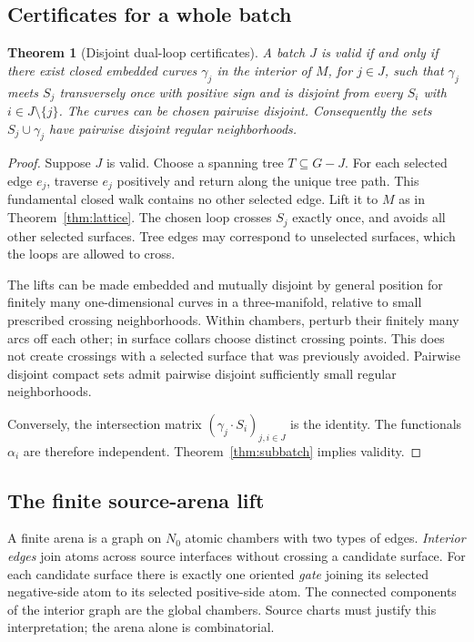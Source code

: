 \documentclass[11pt]{article}
\newtheorem{theorem}{Theorem}[section]
\theoremstyle{definition}
\begin{document}
\subsection{Certificates for a whole batch}
\begin{theorem}[Disjoint dual-loop certificates]\label{thm:loops}
A batch $J$ is valid if and only if there exist closed embedded curves $\gamma_j$ in the interior of $M$, for $j\in J$, such that $\gamma_j$ meets $S_j$ transversely once with positive sign and is disjoint from every $S_i$ with $i\in J\setminus\{j\}$. The curves can be chosen pairwise disjoint. Consequently the sets $S_j\cup\gamma_j$ have pairwise disjoint regular neighborhoods.
\end{theorem}
\begin{proof}
Suppose $J$ is valid. Choose a spanning tree $T\subseteq G-J$. For each selected edge $e_j$, traverse $e_j$ positively and return along the unique tree path. This fundamental closed walk contains no other selected edge. Lift it to $M$ as in Theorem~\ref{thm:lattice}. The chosen loop crosses $S_j$ exactly once, and avoids all other selected surfaces. Tree edges may correspond to unselected surfaces, which the loops are allowed to cross.

The lifts can be made embedded and mutually disjoint by general position for finitely many one-dimensional curves in a three-manifold, relative to small prescribed crossing neighborhoods. Within chambers, perturb their finitely many arcs off each other; in surface collars choose distinct crossing points. This does not create crossings with a selected surface that was previously avoided. Pairwise disjoint compact sets admit pairwise disjoint sufficiently small regular neighborhoods.

Conversely, the intersection matrix $(\gamma_j\cdot S_i)_{j,i\in J}$ is the identity. The functionals $\alpha_i$ are therefore independent. Theorem~\ref{thm:subbatch} implies validity.
\end{proof}

\subsection{The finite source-arena lift}\label{sec:routing}
A finite arena is a graph on $N_0$ atomic chambers with two types of edges. \emph{Interior edges} join atoms across source interfaces without crossing a candidate surface. For each candidate surface there is exactly one oriented \emph{gate} joining its selected negative-side atom to its selected positive-side atom. The connected components of the interior graph are the global chambers. Source charts must justify this interpretation; the arena alone is combinatorial.
\end{document}
